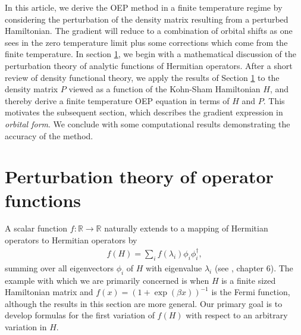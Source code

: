 \documentclass[12pt]{iopart}
\newcommand{\bea}{\begin{eqnarray}} \newcommand{\ena}{\end{eqnarray}}
\newcommand{\reals}{\mathbb{R}}
\newcommand{\dropthis}[1]{}
\begin{document}
In this article, we derive the OEP method in a finite temperature regime
by considering the perturbation of the density matrix resulting from a
perturbed Hamiltonian.
The gradient will reduce to a combination of orbital shifts as one sees
in the zero temperature limit plus some corrections which come from the
finite temperature.  In section \ref{pert_sec}, we begin with a mathematical discussion
of the perturbation theory of analytic functions of Hermitian operators.
After a short review of density functional theory, we apply the results
of Section \ref{pert_sec} to the density matrix $P$ viewed as a function of
the Kohn-Sham Hamiltonian $H$, and thereby derive a finite temperature OEP
equation in terms of $H$ and $P$.   This motivates the subsequent
section, which describes the gradient expression in {\em orbital form}.
We conclude with some computational results demonstrating the accuracy
of the method.

\section{Perturbation theory of operator functions}

\label{pert_sec}

A scalar function $f: \reals \rightarrow \reals$ naturally extends
to a mapping of Hermitian operators to Hermitian operators by
\bea
f(H) = \sum_i f(\lambda_i) \phi_i \phi_i^\dagger,
\ena
summing over all eigenvectors $\phi_i$ of $H$ with eigenvalue $\lambda_i$
(see \cite{HornJohnson.book:91}, chapter 6).
The example with which we are primarily concerned is when $H$ is
a finite sized Hamiltonian matrix and
$f(x) = (1+\exp(\beta x))^{-1}$ is the Fermi function,
although the results in this section are more general.
Our primary goal is to develop formulas for the
first variation of $f(H)$ with respect to an arbitrary 
variation in $H$.
\dropthis{which are amenable to large-scale computation.}
\end{document}
